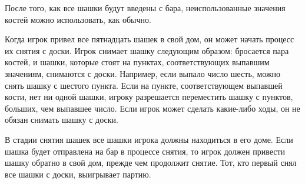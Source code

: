 После того, как все шашки будут введены с бара, неиспользованные значения костей можно использовать, как обычно.

Когда игрок привел все пятнадцать шашек в свой дом, он может начать процесс их снятия с доски. Игрок снимает шашку следующим образом: бросается пара костей, и шашки, которые стоят на пунктах, соответствующих выпавшим значениям, снимаются с доски. Например, если выпало число шесть, можно снять шашку с шестого пункта. Если на пункте, соответствующем выпавшей кости, нет ни одной шашки, игроку разрешается переместить шашку с пунктов, больших, чем выпавшее число. Если игрок может сделать какие-либо ходы, он не обязан снимать шашку с доски.

В стадии снятия шашек все шашки игрока должны находиться в его доме. Если шашка будет отправлена на бар в процессе снятия, то игрок должен привести шашку обратно в свой дом, прежде чем продолжит снятие. Тот, кто первый снял все шашки с доски, выигрывает партию.

